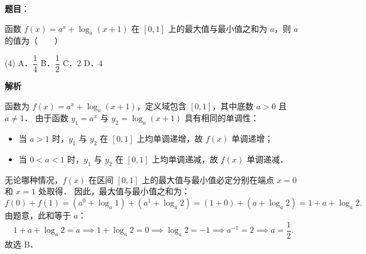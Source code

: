 \begin{answer}

\textbf{题目}：

函数 $f(x) = a^x + \log_a (x + 1)$ 在 $[0, 1]$ 上的最大值与最小值之和为 $a$，则 $a$ 的值为\mbox{（　　）}

\begin{gkopts}(4)
\task A．$\dfrac{1}{4}$
\task B．$\dfrac{1}{2}$
\task C．$2$
\task D．$4$
\end{gkopts}

\textbf{解析}

函数为 $f(x) = a^x + \log_a (x + 1)$，定义域包含 $[0, 1]$，其中底数 $a > 0$ 且 $a \neq 1$．
由于函数 $y_1 = a^x$ 与 $y_2 = \log_a(x+1)$ 具有相同的单调性：
\begin{itemize}
\item 当 $a > 1$ 时，$y_1$ 与 $y_2$ 在 $[0, 1]$ 上均单调递增，故 $f(x)$ 单调递增；
\item 当 $0 < a < 1$ 时，$y_1$ 与 $y_2$ 在 $[0, 1]$ 上均单调递减，故 $f(x)$ 单调递减．
\end{itemize}
无论哪种情况，$f(x)$ 在区间 $[0, 1]$ 上的最大值与最小值必定分别在端点 $x = 0$ 和 $x = 1$ 处取得．
因此，最大值与最小值之和为：
\nopagebreak[4]
\[
f(0) + f(1) = (a^0 + \log_a 1) + (a^1 + \log_a 2) = (1 + 0) + (a + \log_a 2) = 1 + a + \log_a 2.
\]
由题意，此和等于 $a$：
\nopagebreak[4]
\[
1 + a + \log_a 2 = a \implies 1 + \log_a 2 = 0 \implies \log_a 2 = -1 \implies a^{-1} = 2 \implies a = \frac{1}{2}.
\]
故选 B．


\end{answer}
